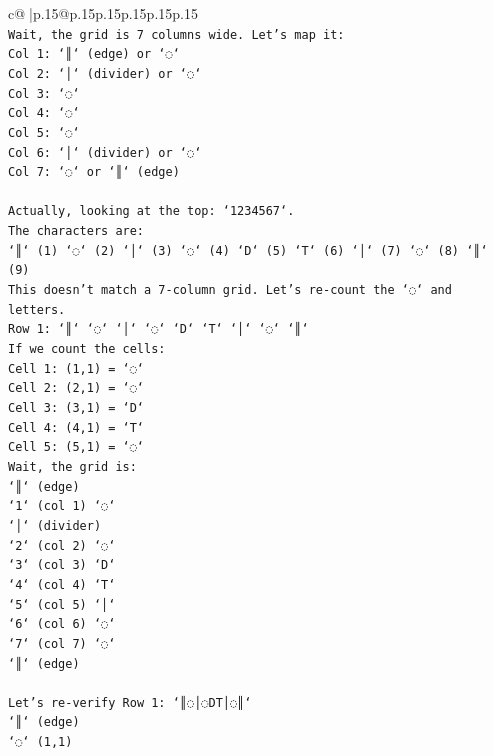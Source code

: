 \documentclass{article}
\begin{document}
{\begin{supertabular}{c@{$\;$}|p{.15\linewidth}@{}p{.15\linewidth}p{.15\linewidth}p{.15\linewidth}p{.15\linewidth}p{.15\linewidth}}
{{{\\ 
\texttt{Wait, the grid is 7 columns wide. Let's map it:} \\
\texttt{Col 1: `║` (edge) or `◌`} \\
\texttt{Col 2: `│` (divider) or `◌`} \\
\texttt{Col 3: `◌`} \\
\texttt{Col 4: `◌`} \\
\texttt{Col 5: `◌`} \\
\texttt{Col 6: `│` (divider) or `◌`} \\
\texttt{Col 7: `◌` or `║` (edge)} \\
\\ 
\texttt{Actually, looking at the top: `1234567`.} \\
\texttt{The characters are:} \\
\texttt{`║` (1) `◌` (2) `│` (3) `◌` (4) `D` (5) `T` (6) `│` (7) `◌` (8) `║` (9)} \\
\texttt{This doesn't match a 7{-}column grid. Let's re{-}count the `◌` and letters.} \\
\texttt{Row 1: `║` `◌` `│` `◌` `D` `T` `│` `◌` `║`} \\
\texttt{If we count the cells:} \\
\texttt{Cell 1: (1,1) = `◌`} \\
\texttt{Cell 2: (2,1) = `◌`} \\
\texttt{Cell 3: (3,1) = `D`} \\
\texttt{Cell 4: (4,1) = `T`} \\
\texttt{Cell 5: (5,1) = `◌`} \\
\texttt{Wait, the grid is:} \\
\texttt{`║` (edge)} \\
\texttt{`1` (col 1) `◌`} \\
\texttt{`│` (divider)} \\
\texttt{`2` (col 2) `◌`} \\
\texttt{`3` (col 3) `D`} \\
\texttt{`4` (col 4) `T`} \\
\texttt{`5` (col 5) `│`} \\
\texttt{`6` (col 6) `◌`} \\
\texttt{`7` (col 7) `◌`} \\
\texttt{`║` (edge)} \\
\\ 
\texttt{Let's re{-}verify Row 1: `║◌│◌DT│◌║`} \\
\texttt{`║` (edge)} \\
\texttt{`◌` (1,1)} \\
}}}
\end{supertabular}}
\end{document}
